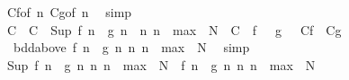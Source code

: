 \begin{isabellebody}
\ C{\isacharunderscore}{\kern0pt}f{\isacharparenleft}{\kern0pt}{}{\isacharparenright}{\kern0pt}{\isacharbrackleft}{\kern0pt}of\ n{\isacharbrackright}{\kern0pt}\ C{\isacharunderscore}{\kern0pt}g{\isacharparenleft}{\kern0pt}{}{\isacharparenright}{\kern0pt}{\isacharbrackleft}{\kern0pt}of\ n{\isacharbrackright}{\kern0pt}\ \isamarkupfalse%
\ simp\isanewline
\isanewline
\ \ \isamarkupfalse%
\ C{\isacharprime}{\kern0pt}\ \ {\isachardoublequoteopen}C{\isacharprime}{\kern0pt}\ {\isacharequal}{\kern0pt}\ Sup\ {\isacharbraceleft}{\kern0pt}{\isasymbar}f\ n\ {\isacharminus}{\kern0pt}\ g\ n{\isasymbar}\ {\isacharbar}{\kern0pt}\ n{\isachardot}{\kern0pt}\ n\ {\isasymin}\ {\isacharbraceleft}{\kern0pt}{}{\isachardot}{\kern0pt}{\isachardot}{\kern0pt}max\ {}\ N{\isacharbraceright}{\kern0pt}{\isacharbraceright}{\kern0pt}\ {\isacharplus}{\kern0pt}\ C\ {\isacharplus}{\kern0pt}\ {\isasymbar}f\ {}{\isasymbar}\ {\isacharplus}{\kern0pt}\ {\isasymbar}g\ {}{\isasymbar}\ {\isacharplus}{\kern0pt}\ C{\isacharunderscore}{\kern0pt}f\ {\isacharplus}{\kern0pt}\ C{\isacharunderscore}{\kern0pt}g{\isachardoublequoteclose}\isanewline
\ \ \isamarkupfalse%
\ {\isacharasterisk}{\kern0pt}{\isacharcolon}{\kern0pt}\ {\isachardoublequoteopen}bdd{\isacharunderscore}{\kern0pt}above\ {\isacharbraceleft}{\kern0pt}{\isasymbar}f\ n\ {\isacharminus}{\kern0pt}\ g\ n{\isasymbar}\ {\isacharbar}{\kern0pt}n{\isachardot}{\kern0pt}\ n\ {\isasymin}\ {\isacharbraceleft}{\kern0pt}{}{\isachardot}{\kern0pt}{\isachardot}{\kern0pt}max\ {}\ N{\isacharbraceright}{\kern0pt}{\isacharbraceright}{\kern0pt}{\isachardoublequoteclose}\ \isamarkupfalse%
\ simp\isanewline
\ \ \isamarkupfalse%
\ {\isachardoublequoteopen}Sup\ {\isacharbraceleft}{\kern0pt}{\isasymbar}f\ n\ {\isacharminus}{\kern0pt}\ g\ n{\isasymbar}\ {\isacharbar}{\kern0pt}n{\isachardot}{\kern0pt}\ n\ {\isasymin}\ {\isacharbraceleft}{\kern0pt}{}{\isachardot}{\kern0pt}{\isachardot}{\kern0pt}max\ {}\ N{\isacharbraceright}{\kern0pt}{\isacharbraceright}{\kern0pt}\ {\isasymin}\ {\isacharbraceleft}{\kern0pt}{\isasymbar}f\ n\ {\isacharminus}{\kern0pt}\ g\ n{\isasymbar}\ {\isacharbar}{\kern0pt}n{\isachardot}{\kern0pt}\ n\ {\isasymin}\ {\isacharbraceleft}{\kern0pt}{}{\isachardot}{\kern0pt}{\isachardot}{\kern0pt}max\ {}\ N{\isacharbraceright}{\kern0pt}{\isacharbraceright}{\kern0pt}{\isachardoublequoteclose}\ \isamarkupfalse%

\end{isabellebody}
